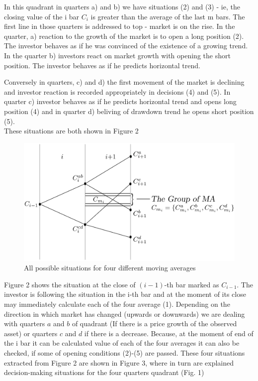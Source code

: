 \documentclass{tewiart}
\begin{document}
In this quadrant in quarters a) and b) we have situations (2) and (3) - ie, the closing value of the i bar $C_i$ is greater than the average of the last m bars. The first line in those quarters is addressed to top - market is on the rise. In the quarter, a) reaction to the growth of the market is to open a long position (2). The investor behaves as if he was convinced of the existence of a growing trend. In the quarter b) investors react on market growth with opening the short position. The investor behaves as if he predicts horizontal trend.

Conversely in quarters, c) and d) the first movement of the market is declining and investor reaction is recorded appropriately in decisions (4) and (5). In quarter c) investor behaves as if he predicts horizontal trend and opens long position (4) and in quarter d) beliving of drawdown trend he opens short position (5). \\
These situations are both shown in Figure 2\\
\begin{figure}[h]
\centering
\centering 
\includegraphics[width=\textwidth]{rysunek1pp.eps}
\caption{All possible situations for four different moving averages}
\end{figure}
\FloatBarrier
\indent Figure 2 shows the situation at the close of $(i-1)$-th bar marked as $C_{i-1}$. The investor is following the situation in the i-th bar and at the moment of its close may immediately calculate each of the four average (1). Depending on the direction in which market has changed (upwards or downwards) we are dealing with quarters $a$ and $b$ of quadrant (If there is a price growth of the observed asset) or quarters $c$ and $d$ if there is a decrease.
Because, at the moment of end of the i bar it can be calculated  value of each of the four averages it can also be checked, if some of opening conditions (2)-(5) are passed. These four situations extracted from Figure 2 are shown in Figure 3, where in turn are explained  decision-making situations for the four quarters quadrant (Fig. 1)\\
\end{document}
